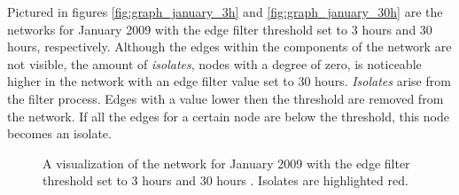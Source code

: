Pictured in figures \ref{fig:graph_january_3h} and  \ref{fig:graph_january_30h} are the networks for January 2009 with the edge filter threshold set to 3 hours and 30 hours, respectively. Although the edges within the components of the network are not visible, the amount of \textit{isolates}, nodes with a degree of zero, is noticeable higher in the network with an edge filter value set to 30 hours. \textit{Isolates} arise from the filter process. Edges with a value lower then the threshold are removed from the network. If all the edges for a certain node are below the threshold, this node becomes an isolate.   

\begin{figure}[htpb]%
	\centering 
	\qquad 
	\caption[Network visualizations with different edge filter values]{A visualization of the network for January 2009 with the edge filter threshold set to 3 hours  and 30 hours . Isolates are highlighted red.} 
	 
\end{figure}    

